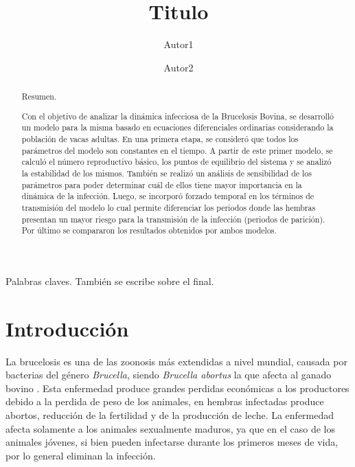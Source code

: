 \documentclass[12pt,preprint,times]{elsarticle}
\begin{document}
\begin{frontmatter}
\title{Titulo }
\date{}
\author[address1,address3]{Autor1}
\author[address1,address2,email]{Autor2}

\address[address1]{Direccion1}
\address[address2]{Direccion2}

\address[address3]{Direccion3}

\address[email]{Corresponding author: email}

\begin{abstract}

\noindent
Resumen. 

Con el objetivo de analizar la dinámica infecciosa de la Brucelosis Bovina, se desarrolló un modelo para la misma basado en ecuaciones diferenciales ordinarias considerando la población de vacas adultas. En una primera etapa, se consideró que todos los parámetros del modelo son constantes en el tiempo. A partir de este primer modelo, se calculó el número reproductivo básico, los puntos de equilibrio del sistema y se analizó la estabilidad de los mismos. También se realizó un análisis de sensibilidad de los parámetros para poder determinar cuál de ellos tiene mayor importancia en la dinámica de la infección. Luego, se incorporó forzado temporal en los términos de transmisión del modelo lo cual permite diferenciar los periodos donde las hembras presentan un mayor riesgo para la transmisión de la infección (periodos de parición). Por último se compararon los resultados obtenidos por ambos modelos. 

\end{abstract}

\begin{keyword}

Palabras claves. También se escribe sobre el final.

\end{keyword}
\end{frontmatter}



\section{Introducción}


La brucelosis  es una de las zoonosis más extendidas a  nivel mundial, causada por bacterias del género \textit{Brucella}, siendo  \textit{Brucella abortus} la que afecta al ganado bovino  \cite{SENASA2014}. Esta enfermedad produce grandes perdidas económicas a los productores debido a la perdida de peso de los animales, en  hembras infectadas produce  abortos, reducción de la fertilidad y de la producción de leche.  La enfermedad afecta solamente a los animales sexualmente maduros, ya que en el caso de los animales jóvenes, si bien pueden infectarse durante los primeros meses de vida, por lo general eliminan la infección. 
\end{document}
